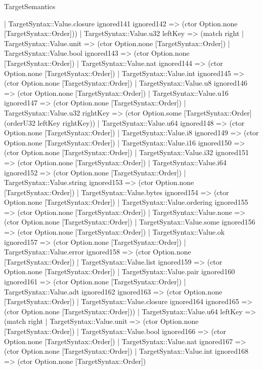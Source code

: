 \begin{lexlean}{TargetSemantics}
\begin{semanticmodule}
{      | TargetSyntax::Value.closure ignored141 ignored142 => (ctor Option.none [TargetSyntax::Order]))
    | TargetSyntax::Value.u32 leftKey => (match right
      | TargetSyntax::Value.unit => (ctor Option.none [TargetSyntax::Order])
      | TargetSyntax::Value.bool ignored143 => (ctor Option.none [TargetSyntax::Order])
      | TargetSyntax::Value.nat ignored144 => (ctor Option.none [TargetSyntax::Order])
      | TargetSyntax::Value.int ignored145 => (ctor Option.none [TargetSyntax::Order])
      | TargetSyntax::Value.u8 ignored146 => (ctor Option.none [TargetSyntax::Order])
      | TargetSyntax::Value.u16 ignored147 => (ctor Option.none [TargetSyntax::Order])
      | TargetSyntax::Value.u32 rightKey => (ctor Option.some [TargetSyntax::Order] (orderU32 leftKey rightKey))
      | TargetSyntax::Value.u64 ignored148 => (ctor Option.none [TargetSyntax::Order])
      | TargetSyntax::Value.i8 ignored149 => (ctor Option.none [TargetSyntax::Order])
      | TargetSyntax::Value.i16 ignored150 => (ctor Option.none [TargetSyntax::Order])
      | TargetSyntax::Value.i32 ignored151 => (ctor Option.none [TargetSyntax::Order])
      | TargetSyntax::Value.i64 ignored152 => (ctor Option.none [TargetSyntax::Order])
      | TargetSyntax::Value.string ignored153 => (ctor Option.none [TargetSyntax::Order])
      | TargetSyntax::Value.bytes ignored154 => (ctor Option.none [TargetSyntax::Order])
      | TargetSyntax::Value.ordering ignored155 => (ctor Option.none [TargetSyntax::Order])
      | TargetSyntax::Value.none => (ctor Option.none [TargetSyntax::Order])
      | TargetSyntax::Value.some ignored156 => (ctor Option.none [TargetSyntax::Order])
      | TargetSyntax::Value.ok ignored157 => (ctor Option.none [TargetSyntax::Order])
      | TargetSyntax::Value.error ignored158 => (ctor Option.none [TargetSyntax::Order])
      | TargetSyntax::Value.list ignored159 => (ctor Option.none [TargetSyntax::Order])
      | TargetSyntax::Value.pair ignored160 ignored161 => (ctor Option.none [TargetSyntax::Order])
      | TargetSyntax::Value.adt ignored162 ignored163 => (ctor Option.none [TargetSyntax::Order])
      | TargetSyntax::Value.closure ignored164 ignored165 => (ctor Option.none [TargetSyntax::Order]))
    | TargetSyntax::Value.u64 leftKey => (match right
      | TargetSyntax::Value.unit => (ctor Option.none [TargetSyntax::Order])
      | TargetSyntax::Value.bool ignored166 => (ctor Option.none [TargetSyntax::Order])
      | TargetSyntax::Value.nat ignored167 => (ctor Option.none [TargetSyntax::Order])
      | TargetSyntax::Value.int ignored168 => (ctor Option.none [TargetSyntax::Order])
}
\end{semanticmodule}
\end{lexlean}
